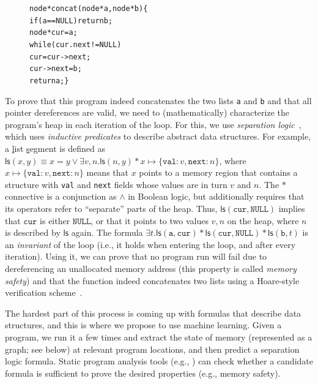 \documentclass{article} %
\newcommand{\SLls}[0]{\ensuremath{\mathsf{ls}}}
\begin{document}
\begin{figure}
\small\vspace{-2ex}
\begin{alltt}
node* concat(node* a, node* b) \{
  if (a == NULL) return b;
  node* cur = a;
  while (cur.next != NULL)
    cur = cur->next;
  cur->next = b;
  return a; \hfill\}
\end{alltt}
\end{figure}
To prove that this program indeed concatenates the two lists \texttt{a} and
\texttt{b} and that all pointer dereferences are valid, we need to
(mathematically) characterize the program's heap in each iteration of the loop.
For this, we use \emph{separation logic}~\citep{OHearn01,Reynolds02}, which uses
\emph{inductive predicates} to describe abstract data structures.
For example, a \underline{l}ist \underline{s}egment is defined as $\SLls(x, y)
\equiv x = y \lor \exists v, n . \SLls(n, y) \ast x \mapsto \{\texttt{val}:v,
\texttt{next}:n\}$, where $x \mapsto \{\texttt{val}:v, \texttt{next}:n\}$ means
that $x$ points to a memory region that contains a structure with \texttt{val}
and \texttt{next} fields whose values are in turn $v$ and $n$.
The $\ast$ connective is a conjunction as $\land$ in Boolean logic, but
additionally requires that its operators refer to ``separate'' parts of the
heap.
Thus, $\SLls(\texttt{cur}, \texttt{NULL})$ implies that $\texttt{cur}$ is either
$\texttt{NULL}$, or that it points to two values $v, n$ on the heap, where $n$
is described by $\SLls$ again.
The formula $ \exists t . \SLls(\texttt{a}, \texttt{cur}) \ast
\SLls(\texttt{cur}, \texttt{NULL}) \ast\SLls(\texttt{b}, t)$ is an
\emph{invariant} of the loop (i.e., it holds when entering the loop, and
after every iteration).
Using it, we can prove that no program run will fail due to dereferencing an
unallocated memory address (this property is called \emph{memory safety}) and
that the function indeed concatenates two lists using a Hoare-style verification
scheme~\citep{Hoare69}.

The hardest part of this process is coming up with formulas that describe
data structures, and this is where we propose to use machine
learning.  Given a program, we run it a few times and
extract the state of memory (represented as a graph; see below) at relevant program locations,
and then predict a separation logic formula.
Static program analysis tools (e.g., \citep{Piskac14}) can check whether a
candidate formula is sufficient to prove the desired properties (e.g., memory
safety).
\end{document}
